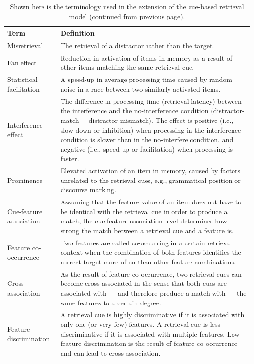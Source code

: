 \documentclass{cambridge7A}\usepackage[]{graphicx}\usepackage[]{color}
\begin{document}
\begin{subappendices}
\begin{table}[!htbp]
\begin{center}
{\footnotesize
\begin{tabular}{p{4cm}p{6cm}}
\hline
Term                & Definition \\
\hline
Misretrieval        & The retrieval of a distractor rather than the target. \\
Fan effect          & Reduction in activation of items in memory as a result of other items matching the same retrieval cue. \\
Statistical facilitation & A speed-up in average processing time caused by random noise in a race between two similarly activated items. \\
Interference effect  & The difference in processing time (retrieval latency) between the interference and the no-interference condition (distractor-match $-$ distractor-mismatch). The effect is positive (i.e., slow-down or inhibition) when processing in the interference condition is slower than in the no-interfere condition, and negative (i.e., speed-up or facilitation) when processing is faster. \\
Prominence          & Elevated activation of an item in memory, caused by factors unrelated to the retrieval cues, e.g., grammatical position or discourse marking. \\
Cue-feature association         & Assuming that the feature value of an item does not have to be identical with the retrieval cue in order to produce a match, the cue-feature association level determines how strong the match between a retrieval cue and a feature is.  \\
Feature co-occurrence  			& Two features are called co-occurring in a certain retrieval context when the combination of both features identifies the correct target more often than other feature combinations. \\
Cross association          & As the result of feature co-occurrence, two retrieval cues can become cross-associated in the sense that both cues are associated with --- and therefore produce a match with --- the same features to a certain degree. \\
Feature discrimination  & A retrieval cue is highly discriminative if it is associated with only one (or very few) features. A retrieval cue is less discriminative if it is associated with multiple features. Low feature discrimination is the result of feature co-occurrence and can lead to cross association. \\
\hline
\end{tabular}
}
\caption{Shown here is the terminology used in the extension of the cue-based retrieval model (continued from previous page).}\label{tab:definitionsEXT2}
\end{center}
\end{table}



\end{subappendices}
\end{document}
